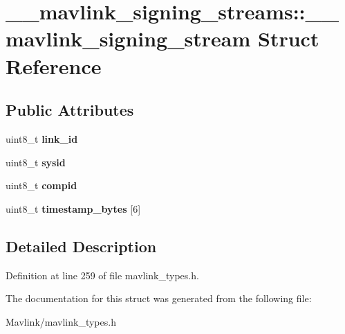 \hypertarget{struct____mavlink__signing__streams_1_1____mavlink__signing__stream}{}\section{\+\_\+\+\_\+mavlink\+\_\+signing\+\_\+streams\+:\+:\+\_\+\+\_\+mavlink\+\_\+signing\+\_\+stream Struct Reference}
\label{struct____mavlink__signing__streams_1_1____mavlink__signing__stream}
\subsection*{Public Attributes}
\begin{DoxyCompactItemize}
\item 
\hypertarget{struct____mavlink__signing__streams_1_1____mavlink__signing__stream_a460c2c122f9a4350bcbdeaea3e5aa534}{}\label{struct____mavlink__signing__streams_1_1____mavlink__signing__stream_a460c2c122f9a4350bcbdeaea3e5aa534} 
uint8\+\_\+t {\bfseries link\+\_\+id}
\item 
\hypertarget{struct____mavlink__signing__streams_1_1____mavlink__signing__stream_ab8826081c0e1c8635ab2b706e046b4f6}{}\label{struct____mavlink__signing__streams_1_1____mavlink__signing__stream_ab8826081c0e1c8635ab2b706e046b4f6} 
uint8\+\_\+t {\bfseries sysid}
\item 
\hypertarget{struct____mavlink__signing__streams_1_1____mavlink__signing__stream_abdeaafd43daa73f208160ac46d510389}{}\label{struct____mavlink__signing__streams_1_1____mavlink__signing__stream_abdeaafd43daa73f208160ac46d510389} 
uint8\+\_\+t {\bfseries compid}
\item 
\hypertarget{struct____mavlink__signing__streams_1_1____mavlink__signing__stream_ac2dacf1fa619460cfe828939921ec091}{}\label{struct____mavlink__signing__streams_1_1____mavlink__signing__stream_ac2dacf1fa619460cfe828939921ec091} 
uint8\+\_\+t {\bfseries timestamp\+\_\+bytes} \mbox{[}6\mbox{]}
\end{DoxyCompactItemize}


\subsection{Detailed Description}


Definition at line 259 of file mavlink\+\_\+types.\+h.



The documentation for this struct was generated from the following file\+:\begin{DoxyCompactItemize}
\item 
Mavlink/mavlink\+\_\+types.\+h\end{DoxyCompactItemize}
